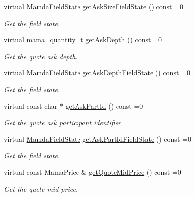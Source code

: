 \begin{CompactItemize}
virtual \hyperlink{namespaceWombat_93aac974f2ab713554fd12a1fa3b7d2a}{Mamda\-Field\-State} \hyperlink{classWombat_1_1MamdaQuotePossiblyDuplicate_4cf3ddbe58a546d9a377c650779ad819}{get\-Ask\-Size\-Field\-State} () const =0
\begin{CompactList}\small\item\em Get the field state. \item\end{CompactList}\item 
virtual mama\_\-quantity\_\-t \hyperlink{classWombat_1_1MamdaQuotePossiblyDuplicate_3eff03cd27a33edc6e2b306aa0c3fa44}{get\-Ask\-Depth} () const =0
\begin{CompactList}\small\item\em Get the quote ask depth. \item\end{CompactList}\item 
virtual \hyperlink{namespaceWombat_93aac974f2ab713554fd12a1fa3b7d2a}{Mamda\-Field\-State} \hyperlink{classWombat_1_1MamdaQuotePossiblyDuplicate_150377938a68d1e2e86eb46e8e415207}{get\-Ask\-Depth\-Field\-State} () const =0
\begin{CompactList}\small\item\em Get the field state. \item\end{CompactList}\item 
virtual const char $\ast$ \hyperlink{classWombat_1_1MamdaQuotePossiblyDuplicate_861181f08a7174f5b2d953a1360a02b7}{get\-Ask\-Part\-Id} () const =0
\begin{CompactList}\small\item\em Get the quote ask participant identifier. \item\end{CompactList}\item 
virtual \hyperlink{namespaceWombat_93aac974f2ab713554fd12a1fa3b7d2a}{Mamda\-Field\-State} \hyperlink{classWombat_1_1MamdaQuotePossiblyDuplicate_efe6c8366375ad3dda4eebc34b34f3eb}{get\-Ask\-Part\-Id\-Field\-State} () const =0
\begin{CompactList}\small\item\em Get the field state. \item\end{CompactList}\item 
virtual const Mama\-Price \& \hyperlink{classWombat_1_1MamdaQuotePossiblyDuplicate_c2dab543a5727df2cba6b320c4be6400}{get\-Quote\-Mid\-Price} () const =0
\begin{CompactList}\small\item\em Get the quote mid price. \item\end{CompactList}\item 

\end{CompactItemize}
